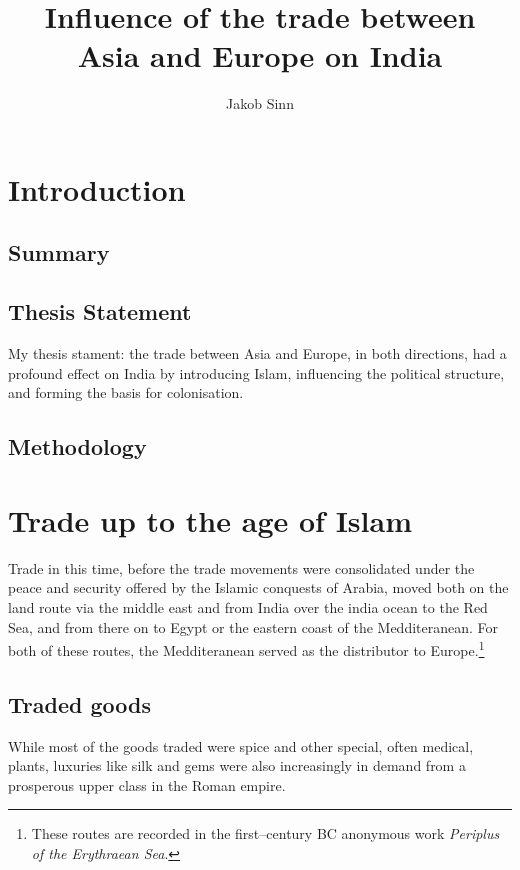 \documentclass[11pt, a4paper, headings=standardclasses]{scrartcl}
\begin{document}
\renewcommand{\baselinestretch}{1.5}
\subject{Facharbeit}
\author{Jakob Sinn}
\title{Influence of the trade between \\ Asia and Europe on India}
\maketitle
\thispagestyle{empty}
\clearpage
\tableofcontents
{}
\clearpage
\section{Introduction}
\subsection{Summary}

\subsection{Thesis Statement}
My thesis stament: the trade between Asia and Europe, in both directions, had a profound effect on India by introducing Islam, influencing the political structure, and forming the basis for colonisation.
\subsection{Methodology}
 
\section{Trade up to the age of Islam}
Trade in this time, before the trade movements were consolidated under the peace and security offered by the Islamic conquests of Arabia, moved both on the land route via the middle east and from India over the india ocean to the Red Sea, and from there on to Egypt or the eastern coast of the Medditeranean.\autocite[Chapter 7]{Rome} For both of these routes, the Medditeranean served as the distributor to Europe.\footnote{These routes are recorded in the first--century BC anonymous work \emph{Periplus of the Erythraean Sea}.}

\subsection{Traded goods}
While most of the goods traded were spice and other special, often medical, plants, luxuries like silk and gems were also increasingly in demand from a prosperous upper class in the Roman empire.\autocite{RIS}
\end{document}
